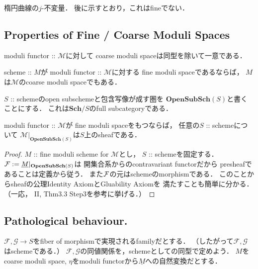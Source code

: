 \documentclass[a4paper]{jsarticle}
\newcommand{\Sch}{\mathbf{Sch}}
\newcommand{\OpenSubSch}{\mathbf{OpenSubSch}}
\newcommand{\famF}{\mathcal{F}}
\newcommand{\famG}{\mathcal{G}}
\newcommand{\func}[1]{\underline{#1}}
\newcommand{\ftorM}{\mathcal{M}}
\begin{document}
    \begin{Example}
        楕円曲線の$j$-不変量．
        後に示すとおり，これはfineでない．
    \end{Example}

    \subsection{Properties of Fine / Coarse Moduli Spaces}
    \begin{Prop}
        moduli functor :: $\ftorM$に対して
        coarse moduli spaceは同型を除いて一意である．
    \end{Prop}

    \begin{Prop}
        scheme :: $M$が
        moduli functor :: $\ftorM$に対する
        fine moduli spaceであるならば，
        $M$は$\ftorM$のcoarse moduli spaceでもある．
    \end{Prop}
    
    \begin{Prop}
        $S$ :: schemeのopen subschemeと包含写像が成す圏を
        $\OpenSubSch(S)$と書くことにする．
        これは$\Sch/S$のfull subcategoryである．

        moduli functor :: $\ftorM$が
        fine moduli spaceをもつならば，
        任意の$S$ :: schemeについて
        $\ftorM|_{\OpenSubSch(S)}$は$S$上のsheafである．
    \end{Prop}
    \begin{proof}
        $M$ :: fine moduli scheme for $\ftorM$とし，
        $S$ :: schemeを固定する．
        $\shF:=\func{M}|_{\OpenSubSch(S)}$は
        開集合系からのcontravariant functorだから
        presheafであることは定義から従う．
        また$\mathcal{F}$の元はschemeのmorphismである．
        このことからsheafの公理Identity AxiomとGluability Axiomを
        満たすことも簡単に分かる．
        （一応，\cite{HarAG} II, Thm3.3 Step3を参考に挙げる．）
    \end{proof}

    \subsection{Pathological behaviour.}
    $\famF, \famG \to S$をfiber of morphismで実現されるfamilyだとする．
    （したがって$\famF, \famG$はschemeである．）
    $\famF, \famG$の同値関係を，schemeとしての同型で定めよう．
    $M$をcoarse moduli space, 
    $\eta$をmoduli functorから$\func{M}$への自然変換だとする．
\end{document}

